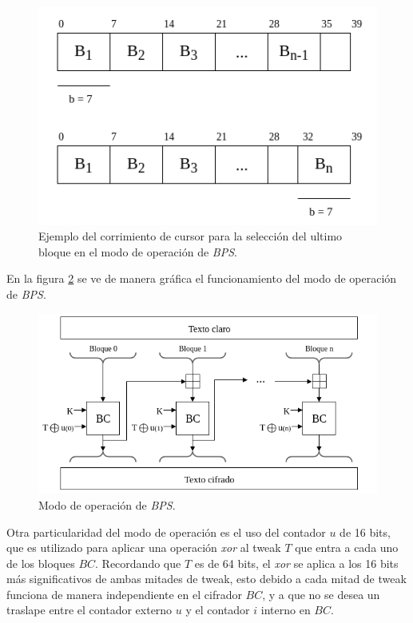 \begin{figure}[H]
  \begin{center}
    \includegraphics[width=0.5\linewidth]
    {../../../../../../diagramas_comunes/bps/cursor_bps}
    \caption{Ejemplo del corrimiento de cursor para la selección del ultimo 
      bloque en el modo de operación de \textit{BPS}.}
    \label{cursor_BPS}
   \end{center}
\end{figure}

En la figura \ref{modo_de_operacion_BPS} se ve de manera gráfica el 
funcionamiento del modo de operación de \textit{BPS}.

\begin{figure}[H]
  \begin{center}
    \includegraphics[width=0.85\linewidth]
    {../../../../../../diagramas_comunes/bps/modo_de_operacion_bps}
    \caption{Modo de operación de \textit{BPS}.}
    \label{modo_de_operacion_BPS}
   \end{center}
\end{figure}

Otra particularidad del modo de operación es el uso del contador $u$ de 16 
bits, que es utilizado para aplicar una operación \textit{xor} al tweak $T$ 
que entra a cada uno de los bloques $BC$. Recordando que $T$ es de 64 bits, 
el \textit{xor} se aplica a los 16 bits más significativos de ambas mitades 
de tweak, esto debido a cada mitad de tweak funciona de manera independiente 
en el cifrador $BC$, y a que no se desea un traslape entre el contador externo 
$u$ y el contador $i$ interno en $BC$.

